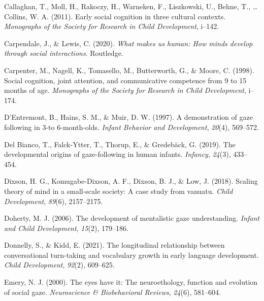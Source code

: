 \documentclass[
  man,floatsintext]{apa6}
\newlength{\cslhangindent}
\newlength{\cslentryspacingunit} %
\newenvironment{CSLReferences}[2] %
 {%
  \setlength{\parindent}{0pt}
  \ifodd #1
  \let\oldpar\par
  \def\par{\hangindent=\cslhangindent\oldpar}
  \fi
  \setlength{\parskip}{#2\cslentryspacingunit}
 }%
 {}
\begin{document}
\begin{CSLReferences}{1}{0}
\leavevmode{}%
Callaghan, T., Moll, H., Rakoczy, H., Warneken, F., Liszkowski, U., Behne, T., \ldots{} Collins, W. A. (2011). Early social cognition in three cultural contexts. \emph{Monographs of the Society for Research in Child Development}, i--142.

\leavevmode{}%
Carpendale, J., \& Lewis, C. (2020). \emph{What makes us human: How minds develop through social interactions}. Routledge.

\leavevmode{}%
Carpenter, M., Nagell, K., Tomasello, M., Butterworth, G., \& Moore, C. (1998). Social cognition, joint attention, and communicative competence from 9 to 15 months of age. \emph{Monographs of the Society for Research in Child Development}, i--174.

\leavevmode{}%
D'Entremont, B., Hains, S. M., \& Muir, D. W. (1997). A demonstration of gaze following in 3-to 6-month-olds. \emph{Infant Behavior and Development}, \emph{20}(4), 569--572.

\leavevmode{}%
Del Bianco, T., Falck-Ytter, T., Thorup, E., \& Gredebäck, G. (2019). The developmental origins of gaze-following in human infants. \emph{Infancy}, \emph{24}(3), 433--454.

\leavevmode{}%
Dixson, H. G., Komugabe-Dixson, A. F., Dixson, B. J., \& Low, J. (2018). Scaling theory of mind in a small-scale society: A case study from vanuatu. \emph{Child Development}, \emph{89}(6), 2157--2175.

\leavevmode{}%
Doherty, M. J. (2006). The development of mentalistic gaze understanding. \emph{Infant and Child Development}, \emph{15}(2), 179--186.

\leavevmode{}%
Donnelly, S., \& Kidd, E. (2021). The longitudinal relationship between conversational turn-taking and vocabulary growth in early language development. \emph{Child Development}, \emph{92}(2), 609--625.

\leavevmode{}%
Emery, N. J. (2000). The eyes have it: The neuroethology, function and evolution of social gaze. \emph{Neuroscience \& Biobehavioral Reviews}, \emph{24}(6), 581--604.


\end{CSLReferences}
\end{document}

